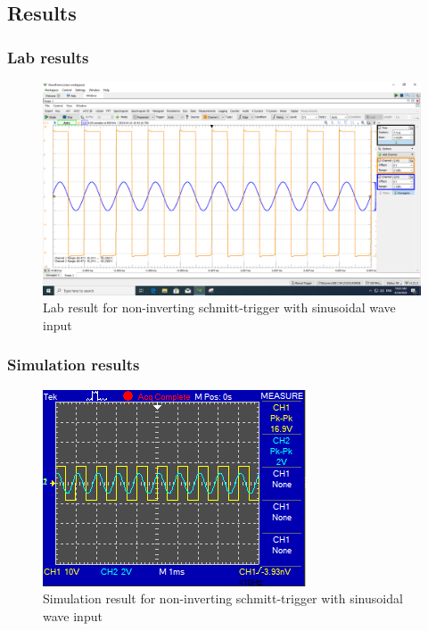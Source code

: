 \documentclass[a4paper, 12pt, english]{article}
\newlength{\simheight}
\begin{document}
\subsection{Results}

\subsubsection{Lab results}
\begin{figure}[H]
    \centering
    \includegraphics[width=\linewidth]{images/Non-Inverting-Schmitt-Trigger-Lab.png}
    \caption{Lab result for non-inverting schmitt-trigger with sinusoidal wave input}
    \label{fig:Lab result for non-inverting schmitt-trigger with sinusoidal wave input}
\end{figure}


\subsubsection{Simulation results}
\begin{figure}[H]
    \centering
    \includegraphics[width=\linewidth, height=\simheight]{images/Non-Inverting-Schmitt-Trigger-Sim.png}
    \caption{Simulation result for non-inverting schmitt-trigger with sinusoidal wave input}
    \label{fig:Simulation result for non-inverting schmitt-trigger with sinusoidal wave input}
\end{figure}
\end{document}
